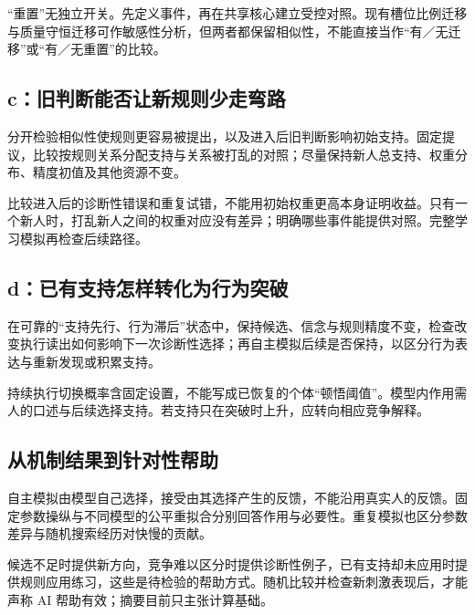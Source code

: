 \documentclass[12pt]{article}
\begin{document}
“重置”无独立开关。先定义事件，再在共享核心建立受控对照。现有槽位比例迁移与质量守恒迁移可作敏感性分析，但两者都保留相似性，不能直接当作“有／无迁移”或“有／无重置”的比较。

\subsection{c：旧判断能否让新规则少走弯路}
分开检验相似性使规则更容易被提出，以及进入后旧判断影响初始支持。固定提议，比较按规则关系分配支持与关系被打乱的对照；尽量保持新人总支持、权重分布、精度初值及其他资源不变。

比较进入后的诊断性错误和重复试错，不能用初始权重更高本身证明收益。只有一个新人时，打乱新人之间的权重对应没有差异；明确哪些事件能提供对照。完整学习模拟再检查后续路径。

\subsection{d：已有支持怎样转化为行为突破}
在可靠的“支持先行、行为滞后”状态中，保持候选、信念与规则精度不变，检查改变执行读出如何影响下一次诊断性选择；再自主模拟后续是否保持，以区分行为表达与重新发现或积累支持。

持续执行切换概率含固定设置，不能写成已恢复的个体“顿悟阈值”。模型内作用需人的口述与后续选择支持。若支持只在突破时上升，应转向相应竞争解释。

\subsection{从机制结果到针对性帮助}
自主模拟由模型自己选择，接受由其选择产生的反馈，不能沿用真实人的反馈。固定参数操纵与不同模型的公平重拟合分别回答作用与必要性。重复模拟也区分参数差异与随机搜索经历对快慢的贡献。

候选不足时提供新方向，竞争难以区分时提供诊断性例子，已有支持却未应用时提供规则应用练习，这些是待检验的帮助方式。随机比较并检查新刺激表现后，才能声称 AI 帮助有效；摘要目前只主张计算基础。
\end{document}
